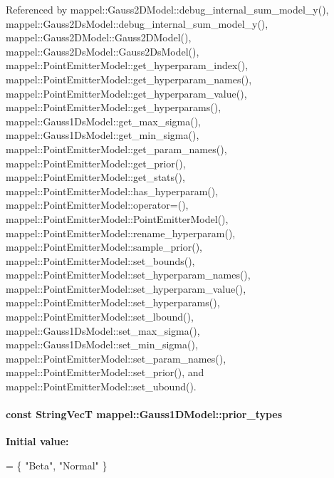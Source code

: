 Referenced by mappel\+::\+Gauss2\+D\+Model\+::debug\+\_\+internal\+\_\+sum\+\_\+model\+\_\+y(), mappel\+::\+Gauss2\+Ds\+Model\+::debug\+\_\+internal\+\_\+sum\+\_\+model\+\_\+y(), mappel\+::\+Gauss2\+D\+Model\+::\+Gauss2\+D\+Model(), mappel\+::\+Gauss2\+Ds\+Model\+::\+Gauss2\+Ds\+Model(), mappel\+::\+Point\+Emitter\+Model\+::get\+\_\+hyperparam\+\_\+index(), mappel\+::\+Point\+Emitter\+Model\+::get\+\_\+hyperparam\+\_\+names(), mappel\+::\+Point\+Emitter\+Model\+::get\+\_\+hyperparam\+\_\+value(), mappel\+::\+Point\+Emitter\+Model\+::get\+\_\+hyperparams(), mappel\+::\+Gauss1\+Ds\+Model\+::get\+\_\+max\+\_\+sigma(), mappel\+::\+Gauss1\+Ds\+Model\+::get\+\_\+min\+\_\+sigma(), mappel\+::\+Point\+Emitter\+Model\+::get\+\_\+param\+\_\+names(), mappel\+::\+Point\+Emitter\+Model\+::get\+\_\+prior(), mappel\+::\+Point\+Emitter\+Model\+::get\+\_\+stats(), mappel\+::\+Point\+Emitter\+Model\+::has\+\_\+hyperparam(), mappel\+::\+Point\+Emitter\+Model\+::operator=(), mappel\+::\+Point\+Emitter\+Model\+::\+Point\+Emitter\+Model(), mappel\+::\+Point\+Emitter\+Model\+::rename\+\_\+hyperparam(), mappel\+::\+Point\+Emitter\+Model\+::sample\+\_\+prior(), mappel\+::\+Point\+Emitter\+Model\+::set\+\_\+bounds(), mappel\+::\+Point\+Emitter\+Model\+::set\+\_\+hyperparam\+\_\+names(), mappel\+::\+Point\+Emitter\+Model\+::set\+\_\+hyperparam\+\_\+value(), mappel\+::\+Point\+Emitter\+Model\+::set\+\_\+hyperparams(), mappel\+::\+Point\+Emitter\+Model\+::set\+\_\+lbound(), mappel\+::\+Gauss1\+Ds\+Model\+::set\+\_\+max\+\_\+sigma(), mappel\+::\+Gauss1\+Ds\+Model\+::set\+\_\+min\+\_\+sigma(), mappel\+::\+Point\+Emitter\+Model\+::set\+\_\+param\+\_\+names(), mappel\+::\+Point\+Emitter\+Model\+::set\+\_\+prior(), and mappel\+::\+Point\+Emitter\+Model\+::set\+\_\+ubound().

\paragraph[{\texorpdfstring{prior\+\_\+types}{prior_types}}]{\setlength{\rightskip}{0pt plus 5cm}const {\bf String\+VecT} mappel\+::\+Gauss1\+D\+Model\+::prior\+\_\+types\hspace{0.3cm}{\ttfamily [static]}}\hypertarget{classmappel_1_1Gauss1DModel_a2f72a3c4729aa81d8ffdd96a60374cd6}{}\label{classmappel_1_1Gauss1DModel_a2f72a3c4729aa81d8ffdd96a60374cd6}
{\bfseries Initial value\+:}
\begin{DoxyCode}
= \{ \textcolor{stringliteral}{"Beta"}, 
                                                       \textcolor{stringliteral}{"Normal"}  
                                                      \}
\end{DoxyCode}


